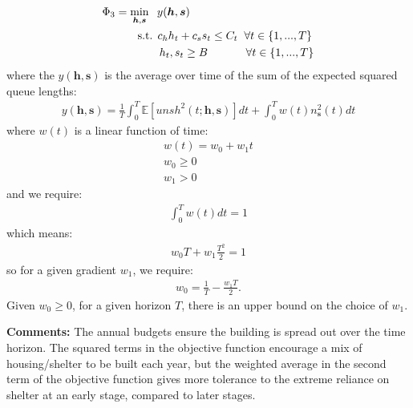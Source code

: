 \documentclass{article}
\begin{document}
\begin{align*}
        & \Phi_3 = \min_{\boldsymbol{h},\boldsymbol{s}} \hspace{0.2cm} y(\boldsymbol{h},\boldsymbol{s}) \\
        & \hspace{1cm} \text{ s.t. } c_{h}h_{t} + c_{s}s_{t} \leq C_t \hspace{0.2cm} \forall t \in \{1, ..., T\} \\
        & \hspace{1.8cm} h_t, s_t \geq B \hspace{1.2cm} \forall t \in \{1, ..., T\}
\end{align*}
%
where the $y(\boldsymbol{h},\boldsymbol{s})$ is the average over time of the sum of the expected squared queue lengths: 
\begin{align*}
  y(\boldsymbol{h},\boldsymbol{s}) = \frac{1}{T} \int_0^T \mathbb{E}[unsh^2(t; \boldsymbol{h},\boldsymbol{s})] dt + \int_0^T w(t) n_{\boldsymbol{s}}^2(t) dt
\end{align*}
%
where $w(t)$ is a linear function of time: 
%
\begin{align*}
  w(t) = w_0 + w_1 t\\
  w_0 \geq 0 \\
  w_1 > 0
  \end{align*}
and we require:
%
\begin{align*}
\int_0^T w(t) dt = 1
\end{align*}
which means: 
% 
\begin{align*}
w_0T + w_1\frac{T^2}{2} = 1
\end{align*}
so for a given gradient $w_1$, we require: 
\begin{align*}
w_0 = \frac{1}{T} - \frac{w_1T}{2}.
\end{align*}
Given $w_0 \geq 0$, for a given horizon $T$, there is an upper bound on the choice of $w_1$. \par
%
\textbf{Comments:} The annual budgets ensure the building is spread out over the time horizon. The squared terms in the objective function encourage a mix of housing/shelter to be built each year, but the weighted average in the second term of the objective function gives more tolerance to the extreme reliance on shelter at an early stage, compared to later stages.
\end{document}

